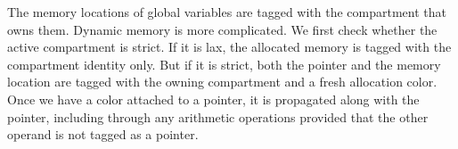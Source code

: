 \documentclass{article}
\begin{document}
The memory locations of global variables are tagged with the compartment that owns them.
Dynamic memory is more complicated. We first check whether the active compartment is strict.
If it is lax, the allocated memory is tagged with the compartment identity only. But if it is
strict, both the pointer and the memory location are tagged with the owning compartment and
a fresh allocation color. Once we have a color attached to a pointer, it is propagated along
with the pointer, including through any arithmetic operations provided that the other operand
is not tagged as a pointer.

\hspace{-5em}
\begin{minipage}{0.35\textwidth}
\end{minipage}
\begin{minipage}{0.35\textwidth}
\end{minipage}
\end{document}
